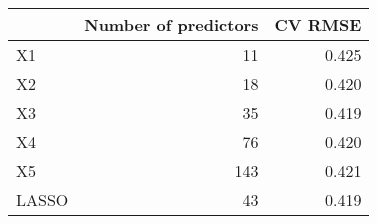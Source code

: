 
\begin{tabular}{lrr}
\toprule
  & Number of predictors & CV RMSE\\
\midrule
X1 & 11 & 0.425\\
X2 & 18 & 0.420\\
X3 & 35 & 0.419\\
X4 & 76 & 0.420\\
X5 & 143 & 0.421\\
LASSO & 43 & 0.419\\
\bottomrule
\end{tabular}